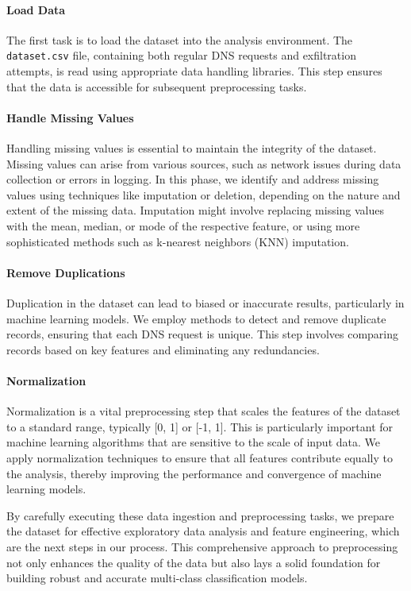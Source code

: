 \paragraph{Load Data}
The first task is to load the dataset into the analysis environment. The \texttt{dataset.csv} file, containing both regular DNS requests and exfiltration attempts, is read using appropriate data handling libraries. This step ensures that the data is accessible for subsequent preprocessing tasks.

\paragraph{Handle Missing Values}
Handling missing values is essential to maintain the integrity of the dataset. Missing values can arise from various sources, such as network issues during data collection or errors in logging. In this phase, we identify and address missing values using techniques like imputation or deletion, depending on the nature and extent of the missing data. Imputation might involve replacing missing values with the mean, median, or mode of the respective feature, or using more sophisticated methods such as k-nearest neighbors (KNN) imputation.

\paragraph{Remove Duplications}
Duplication in the dataset can lead to biased or inaccurate results, particularly in machine learning models. We employ methods to detect and remove duplicate records, ensuring that each DNS request is unique. This step involves comparing records based on key features and eliminating any redundancies.

\paragraph{Normalization}
Normalization is a vital preprocessing step that scales the features of the dataset to a standard range, typically [0, 1] or [-1, 1]. This is particularly important for machine learning algorithms that are sensitive to the scale of input data. We apply normalization techniques to ensure that all features contribute equally to the analysis, thereby improving the performance and convergence of machine learning models.

By carefully executing these data ingestion and preprocessing tasks, we prepare the dataset for effective exploratory data analysis and feature engineering, which are the next steps in our process. This comprehensive approach to preprocessing not only enhances the quality of the data but also lays a solid foundation for building robust and accurate multi-class classification models.



